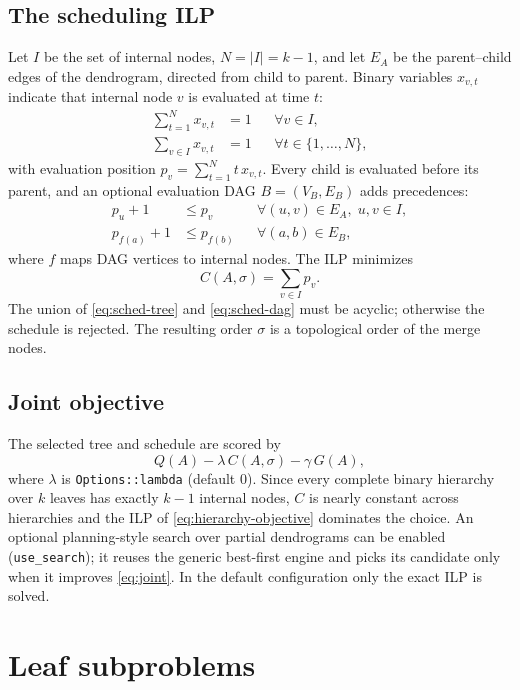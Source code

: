\documentclass[11pt,a4paper]{article}
\begin{document}
\subsection{The scheduling ILP}
Let $I$ be the set of internal nodes, $N=|I|=k-1$, and let $E_A$ be the
parent--child edges of the dendrogram, directed from child to parent. Binary
variables $x_{v,t}$ indicate that internal node $v$ is evaluated at time $t$:
\begin{align}
\sum_{t=1}^{N}x_{v,t}&=1 && \forall v\in I,
\label{eq:sched-once}\\
\sum_{v\in I}x_{v,t}&=1 && \forall t\in\{1,\dots,N\},
\label{eq:sched-slot}
\end{align}
with evaluation position $p_v=\sum_{t=1}^{N}t\,x_{v,t}$. Every child is
evaluated before its parent, and an optional evaluation DAG
$B=(V_B,E_B)$ adds precedences:
\begin{align}
p_u+1&\le p_v && \forall (u,v)\in E_A,\;u,v\in I,
\label{eq:sched-tree}\\
p_{f(a)}+1&\le p_{f(b)} && \forall (a,b)\in E_B,
\label{eq:sched-dag}
\end{align}
where $f$ maps DAG vertices to internal nodes. The ILP minimizes
\begin{equation}
C(A,\sigma)=\sum_{v\in I}p_v.
\end{equation}
The union of \eqref{eq:sched-tree} and \eqref{eq:sched-dag} must be acyclic;
otherwise the schedule is rejected. The resulting order
$\sigma$ is a topological order of the merge nodes.

\subsection{Joint objective}
The selected tree and schedule are scored by
\begin{equation}
Q(A)-\lambda\,C(A,\sigma)-\gamma\,G(A),
\label{eq:joint}
\end{equation}
where $\lambda$ is \texttt{Options::lambda} (default $0$). Since every complete
binary hierarchy over $k$ leaves has exactly $k-1$ internal nodes, $C$ is
nearly constant across hierarchies and the ILP of
\eqref{eq:hierarchy-objective} dominates the choice. An optional
planning-style search over partial dendrograms can be enabled
(\texttt{use\_search}); it reuses the generic best-first engine and picks its
candidate only when it improves \eqref{eq:joint}. In the default configuration
only the exact ILP is solved.

\section{Leaf subproblems}
\label{sec:leaves}
\end{document}
